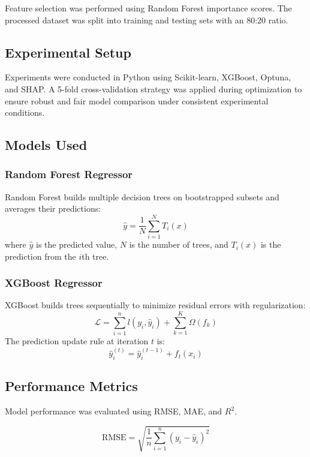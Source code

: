 \documentclass[12pt,a4paper]{article}
\begin{document}
Feature selection was performed using Random Forest importance scores. The processed dataset was split into training and testing sets with an 80:20 ratio.

\subsection{Experimental Setup}
Experiments were conducted in Python using Scikit-learn, XGBoost, Optuna, and SHAP. A 5-fold cross-validation strategy was applied during optimization to ensure robust and fair model comparison under consistent experimental conditions.

\subsection{Models Used}
\subsubsection{Random Forest Regressor}
Random Forest builds multiple decision trees on bootstrapped subsets and averages their predictions:
\begin{equation}
\hat{y} = \frac{1}{N} \sum_{i=1}^{N} T_i(x)
\end{equation}
where $\hat{y}$ is the predicted value, $N$ is the number of trees, and $T_i(x)$ is the prediction from the $i$th tree.

\subsubsection{XGBoost Regressor}
XGBoost builds trees sequentially to minimize residual errors with regularization:
\begin{equation}
\mathcal{L} = \sum_{i=1}^{n} l(y_i, \hat{y}_i) + \sum_{k=1}^{K} \Omega(f_k)
\end{equation}
The prediction update rule at iteration $t$ is:
\begin{equation}
\hat{y}_i^{(t)} = \hat{y}_i^{(t-1)} + f_t(x_i)
\end{equation}

\subsection{Performance Metrics}
Model performance was evaluated using RMSE, MAE, and $R^2$.

\begin{equation}
\mathrm{RMSE} = \sqrt{\frac{1}{n}\sum_{i=1}^{n}(y_i - \hat{y}_i)^2}
\end{equation}
\end{document}

